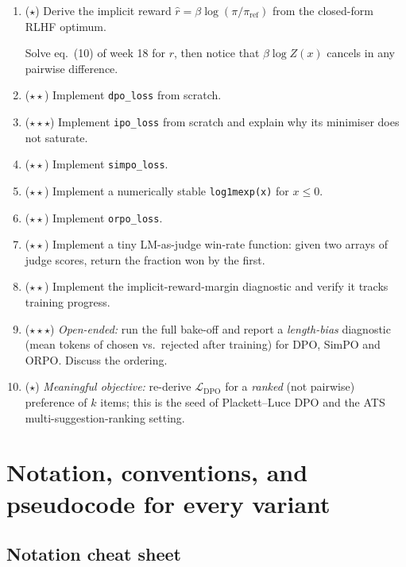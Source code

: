 \documentclass[11pt,oneside]{scrbook}
\begin{document}
\begin{enumerate}[leftmargin=*]
  \item ($\star$) Derive the implicit reward $\hat r = \beta \log
        (\pi/\pi_{\text{ref}})$ from the closed-form RLHF optimum.
        \begin{intuition} Solve eq.\ (10) of week 18 for $r$, then
        notice that $\beta\log Z(x)$ cancels in any pairwise difference.
        \end{intuition}
  \item ($\star\star$) Implement \texttt{dpo\_loss} from scratch.
  \item ($\star\star\star$) Implement \texttt{ipo\_loss} from scratch
        and explain why its minimiser does not saturate.
  \item ($\star\star$) Implement \texttt{simpo\_loss}.
  \item ($\star\star$) Implement a numerically stable
        \texttt{log1mexp(x)} for $x \le 0$.
  \item ($\star\star$) Implement \texttt{orpo\_loss}.
  \item ($\star\star$) Implement a tiny LM-as-judge win-rate function:
        given two arrays of judge scores, return the fraction won by
        the first.
  \item ($\star\star$) Implement the implicit-reward-margin
        diagnostic and verify it tracks training progress.
  \item ($\star\star\star$) \emph{Open-ended:} run the full bake-off
        and report a \emph{length-bias} diagnostic (mean tokens of
        chosen vs.\ rejected after training) for DPO, SimPO and
        ORPO. Discuss the ordering.
  \item ($\star$) \emph{Meaningful objective:} re-derive
        $\mathcal{L}_{\text{DPO}}$ for a \emph{ranked} (not pairwise)
        preference of $k$ items; this is the seed of Plackett--Luce
        DPO and the ATS multi-suggestion-ranking setting.
\end{enumerate}

\chapter{Notation, conventions, and pseudocode for every variant}

\section{Notation cheat sheet}
\end{document}
